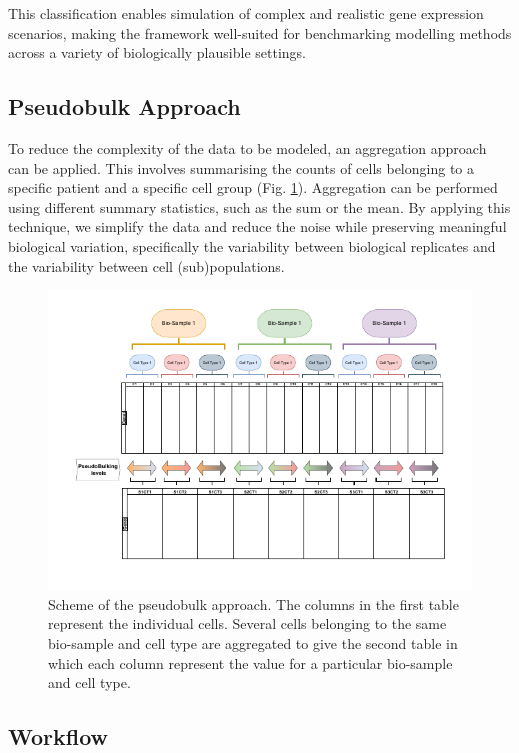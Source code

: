 \documentclass[a4paper, 11pt, twocolumn]{article}
\begin{document}
\begin{multicols}{2}
This classification enables simulation of complex and realistic gene expression scenarios, making the framework well-suited for benchmarking modelling methods across a variety of biologically plausible settings.

\subsection{Pseudobulk Approach}

To reduce the complexity of the data to be modeled, an aggregation approach can be applied. This involves summarising the counts of cells belonging to a specific patient and a specific cell group (Fig. \ref{fig:pseudobulk}). Aggregation can be performed using different summary statistics, such as the sum or the mean. By applying this technique, we simplify the data and reduce the noise while preserving meaningful biological variation, specifically the variability between biological replicates and the variability between cell (sub)populations.
\begin{figure}[H]
	\centering
	\includegraphics[width=1\columnwidth]{img/rnapseudobulk.drawio-1.pdf}
	\caption{{\footnotesize Scheme of the pseudobulk approach. The columns in the first table represent the individual cells. Several cells belonging to the same bio-sample and cell type are aggregated to give the second table in which each column represent the value for a particular bio-sample and cell type.}}
	\label{fig:pseudobulk}
\end{figure}

\subsection{Workflow}


\end{multicols}
\end{document}
